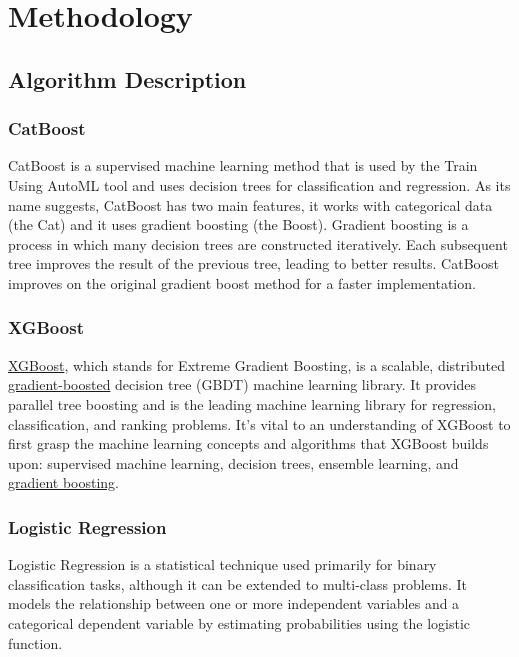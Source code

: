 \chapter{Methodology}
\label{ch:method} %

\section{Algorithm Description}
\subsection{CatBoost}
CatBoost is a supervised machine learning method that is used by the Train Using AutoML tool and uses decision trees for classification and regression. As its name suggests, CatBoost has two main features, it works with categorical data (the Cat) and it uses gradient boosting (the Boost). Gradient boosting is a process in which many decision trees are constructed iteratively. Each subsequent tree improves the result of the previous tree, leading to better results. CatBoost improves on the original gradient boost method for a faster implementation.

\subsection{XGBoost}
\href{https://xgboost.ai/}{XGBoost}, which stands for Extreme Gradient Boosting, is a scalable, distributed \href{https://en.wikipedia.org/wiki/Gradient_boosting}{gradient-boosted} decision tree (GBDT) machine learning library. It provides parallel tree boosting and is the leading machine learning library for regression, classification, and ranking problems. It’s vital to an understanding of XGBoost to first grasp the machine learning concepts and algorithms that XGBoost builds upon: supervised machine learning, decision trees, ensemble learning, and \href{https://developer.nvidia.com/blog/gradient-boosting-decision-trees-xgboost-cuda/}{gradient boosting}.

\subsection{Logistic Regression}
Logistic Regression is a statistical technique used primarily for binary classification tasks, although it can be extended to multi-class problems. It models the relationship between one or more independent variables and a categorical dependent variable by estimating probabilities using the logistic function.

